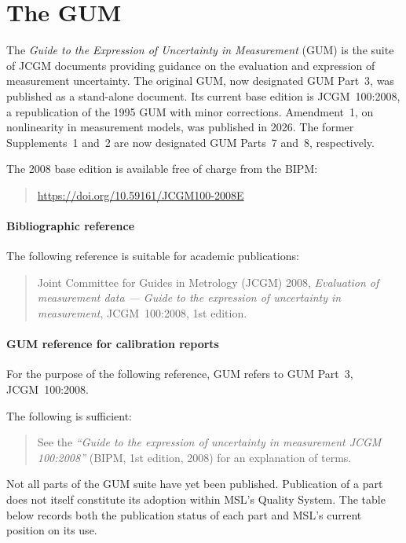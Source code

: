 \section{The GUM}

The \textit{Guide to the Expression of Uncertainty in Measurement} (GUM)
is the suite of JCGM documents providing guidance on the evaluation and
expression of measurement uncertainty. The original GUM, now designated
GUM Part~3, was published as a stand-alone document. Its current base
edition is JCGM~100:2008, a republication of the 1995 GUM with minor
corrections. Amendment~1, on nonlinearity in measurement models, was
published in 2026. The former Supplements~1 and~2 are now designated GUM
Parts~7 and~8, respectively.

The 2008 base edition is available free of charge from the BIPM:
\begin{quote}
\url{https://doi.org/10.59161/JCGM100-2008E}
\end{quote}

\paragraph{Bibliographic reference}
The following reference is suitable for academic publications:
\begin{quote}
Joint Committee for Guides in Metrology (JCGM) 2008,
\textit{Evaluation of measurement data --- Guide to the expression of
uncertainty in measurement}, JCGM~100:2008, 1st edition.
\end{quote}

\paragraph{GUM reference for calibration reports}
For the purpose of the following reference, GUM refers to GUM Part~3,
JCGM~100:2008.

The following is sufficient:
\begin{quote}
See the \textit{``Guide to the expression of uncertainty in measurement
JCGM 100:2008''} (BIPM, 1st edition, 2008) for an explanation of terms.
\end{quote}

Not all parts of the GUM suite have yet been published. Publication of a
part does not itself constitute its adoption within MSL's Quality System.
The table below records both the publication status of each part and
MSL's current position on its use.

